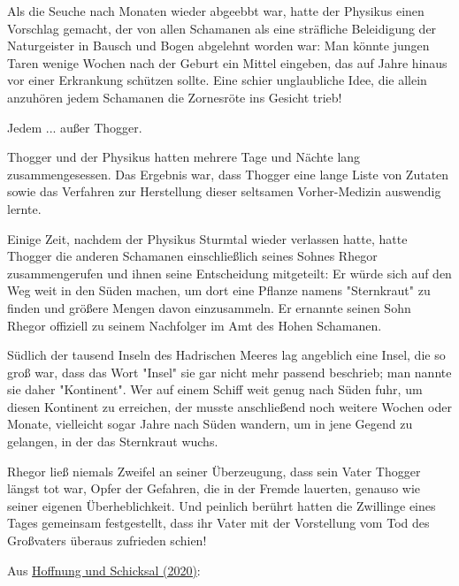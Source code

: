 \documentclass[10pt, a4paper, oneside]{book}
\newcommand{\refstorytext}[1]{\hyperref[Storytext: #1]{#1}}
\begin{document}
\begin{multicols}{2}
Als die Seuche nach Monaten wieder abgeebbt war, hatte der Physikus einen Vorschlag gemacht, der von allen Schamanen als eine sträfliche Beleidigung der Naturgeister in Bausch und Bogen abgelehnt worden war: Man könnte jungen Taren wenige Wochen nach der Geburt ein Mittel eingeben, das auf Jahre hinaus vor einer Erkrankung schützen sollte. Eine schier unglaubliche Idee, die allein anzuhören jedem Schamanen die Zornesröte ins Gesicht trieb! 

Jedem ... außer Thogger. 

Thogger und der Physikus hatten mehrere Tage und Nächte lang zusammengesessen. Das Ergebnis war, dass Thogger eine lange Liste von Zutaten sowie das Verfahren zur Herstellung dieser seltsamen Vorher-Medizin auswendig lernte. 

Einige Zeit, nachdem der Physikus Sturmtal wieder verlassen hatte, hatte Thogger die anderen Schamanen einschließlich seines Sohnes Rhegor zusammengerufen und ihnen seine Entscheidung mitgeteilt: Er würde sich auf den Weg weit in den Süden machen, um dort eine Pflanze namens "Sternkraut" zu finden und größere Mengen davon einzusammeln. Er ernannte seinen Sohn Rhegor offiziell zu seinem Nachfolger im Amt des Hohen Schamanen. 

Südlich der tausend Inseln des Hadrischen Meeres lag angeblich eine Insel, die so groß war, dass das Wort "Insel" sie gar nicht mehr passend beschrieb; man nannte sie daher "Kontinent". Wer auf einem Schiff weit genug nach Süden fuhr, um diesen Kontinent zu erreichen, der musste anschließend noch weitere Wochen oder Monate, vielleicht sogar Jahre nach Süden wandern, um in jene Gegend zu gelangen, in der das Sternkraut wuchs. 

Rhegor ließ niemals Zweifel an seiner Überzeugung, dass sein Vater Thogger längst tot war, Opfer der Gefahren, die in der Fremde lauerten, genauso wie seiner eigenen Überheblichkeit. Und peinlich berührt hatten die Zwillinge eines Tages gemeinsam festgestellt, dass ihr Vater mit der Vorstellung vom Tod des Großvaters überaus zufrieden schien!

\begin{center}
    Aus \refstorytext{Hoffnung und Schicksal (2020)}:
\end{center}


\end{multicols}
\end{document}
